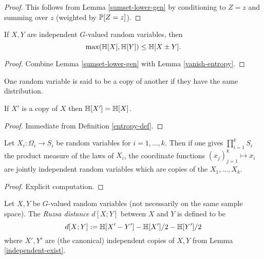 \begin{proof} \leanok This follows from Lemma \ref{sumset-lower-gen} by conditioning to $Z = z$ and summing over $z$ (weighted by $ \mathbb{P}[Z=z]$).
\end{proof}

\begin{corollary}\label{sumset-lower}
  \leanok
  If $X,Y$ are independent $G$-valued random variables, then
$$\max(\mathbb{H}[X], \mathbb{H}[Y]) \leq \mathbb{H}[X\pm Y].
$$
\end{corollary}

\begin{proof} \leanok Combine Lemma \ref{sumset-lower-gen} with Lemma \ref{vanish-entropy}.
\end{proof}

One random variable is said to be a copy of another if they have the same distribution.

\begin{lemma}\label{copy-ent}
  \leanok
  If $X'$ is a copy of $X$ then $\mathbb{H}[X'] = \mathbb{H}[X]$.
\end{lemma}

\begin{proof}\leanok Immediate from Definition \ref{entropy-def}.
\end{proof}

\begin{lemma}\label{independent-exist}
   \leanok
  Let $X_i : \Omega_i \to S_i$ be random variables for $i=1,\dots,k$.  Then if one gives $\prod_{i=1}^k S_i$ the product measure of the laws of $X_i$, the coordinate functions $(x_j)_{j=1}^k \mapsto x_i$ are jointly independent random variables which are copies of the $X_1,\dots,X_k$.
\end{lemma}

\begin{proof} \leanok
  Explicit computation.
\end{proof}

\begin{definition}\label{ruz-dist-def}
  \leanok
  Let $X,Y$ be $G$-valued random variables (not necessarily on the same sample space).  The \emph{Ruzsa distance} $d[X ;Y]$ between $X$ and $Y$ is defined to be
$$ d[X ;Y] := \mathbb{H}[X' - Y'] - \mathbb{H}[X']/2 - \mathbb{H}[Y']/2$$
where $X',Y'$ are (the canonical) independent copies of $X,Y$ from Lemma \ref{independent-exist}.
\end{definition}


